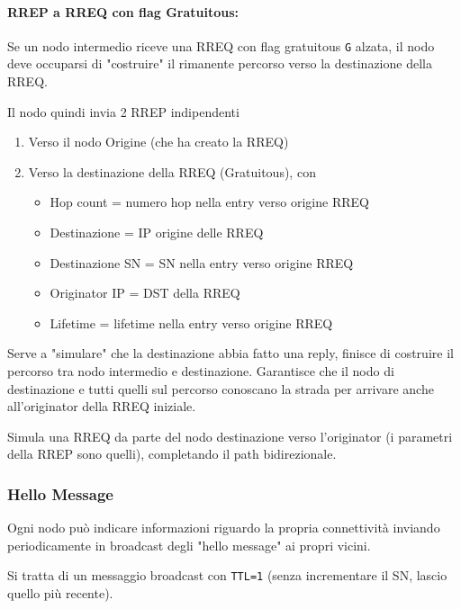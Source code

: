 \paragraph{RREP a RREQ con flag Gratuitous:} Se un nodo intermedio riceve una RREQ con flag gratuitous \texttt{G} alzata, il nodo deve occuparsi di "costruire" il rimanente percorso verso la destinazione della RREQ.

Il nodo quindi invia 2 RREP indipendenti
\begin{enumerate}
	\item Verso il nodo Origine (che ha creato la RREQ)
	
    \item Verso la destinazione della RREQ (Gratuitous), con 
	\begin{itemize}[noitemsep]
		\item Hop count = numero hop nella entry verso origine RREQ

		\item Destinazione = IP origine delle RREQ

		\item Destinazione SN = SN nella entry verso origine RREQ

		\item Originator IP = DST della RREQ

		\item Lifetime = lifetime nella entry verso origine RREQ
	\end{itemize}
\end{enumerate}

Serve a "simulare" che la destinazione abbia fatto una reply, finisce di costruire il percorso tra nodo intermedio e destinazione. Garantisce che il nodo di destinazione e tutti quelli sul percorso conoscano la strada per arrivare anche all'originator della RREQ iniziale. 

Simula una RREQ da parte del nodo destinazione verso l'originator (i parametri della RREP sono quelli), completando il path bidirezionale.

\subsubsection{Hello Message}

Ogni nodo può indicare informazioni riguardo la propria connettività inviando periodicamente in broadcast degli "hello message" ai propri vicini. 

Si tratta di un messaggio broadcast con \texttt{TTL=1} (senza incrementare il SN, lascio quello più recente).


